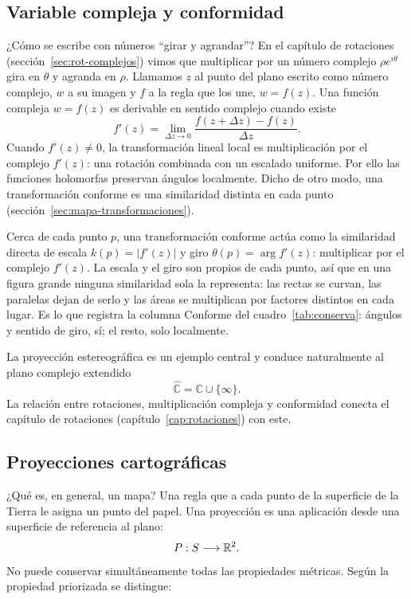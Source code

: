\subsection{Variable compleja y conformidad}

¿Cómo se escribe con números \enquote{girar y agrandar}? En el capítulo de rotaciones
(sección~\ref{sec:rot-complejos}) vimos que multiplicar por un número complejo
\(\rho e^{i\theta}\) gira en \(\theta\) y agranda en \(\rho\). Llamamos \(z\) al punto del
plano escrito como número complejo, \(w\) a su imagen y \(f\) a la regla que los une, \(w=f(z)\).
Una función compleja \(w=f(z)\) es derivable en sentido complejo cuando existe
\[
  f'(z)=\lim_{\Delta z\to0}
  \frac{f(z+\Delta z)-f(z)}{\Delta z}.
\]
Cuando \(f'(z)\neq0\), la transformación lineal local es multiplicación por el complejo
\(f'(z)\): una rotación combinada con un escalado uniforme. Por ello las funciones holomorfas
preservan ángulos localmente.
Dicho de otro modo, una transformación conforme es una similaridad distinta en cada punto
(sección~\ref{sec:mapa-transformaciones}).

\begin{idea}
Cerca de cada punto \(p\), una transformación conforme actúa como la similaridad directa de
escala \(k(p)=\lvert f'(z)\rvert\) y giro \(\theta(p)=\arg f'(z)\): multiplicar por el
complejo \(f'(z)\). La escala y el giro son propios de cada punto, así que en una figura grande
ninguna similaridad sola la representa: las rectas se curvan, las paralelas dejan de serlo y
las áreas se multiplican por factores distintos en cada lugar. Es lo que registra la columna
Conforme del cuadro~\ref{tab:conserva}: ángulos y sentido de giro, sí; el resto, solo
localmente.
\end{idea}

La proyección estereográfica es un ejemplo central y conduce naturalmente al plano complejo
extendido
\[
  \widehat{\mathbb C}=\mathbb C\cup\{\infty\}.
\]
La relación entre rotaciones, multiplicación compleja y conformidad conecta el capítulo de
rotaciones (capítulo~\ref{cap:rotaciones}) con este.

\subsection{Proyecciones cartográficas}\label{sec:proyecciones}

¿Qué es, en general, un mapa? Una regla que a cada punto de la superficie de la Tierra le
asigna un punto del papel. Una proyección es una aplicación desde una superficie de referencia al plano:
\[
  P:S\longrightarrow\mathbb{R}^2.
\]
No puede conservar simultáneamente todas las propiedades métricas. Según la propiedad
priorizada se distingue:

